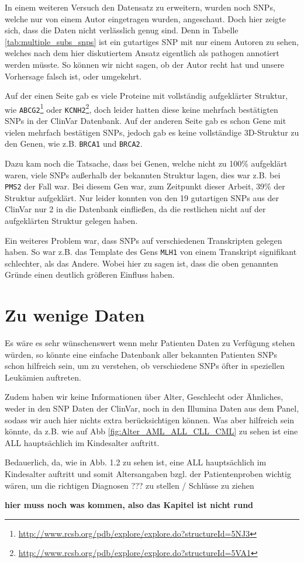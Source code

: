In einem weiteren Versuch den Datensatz zu erweitern, wurden noch \ac{SNP}s, welche nur von einem Autor eingetragen wurden, angeschaut. Doch hier zeigte sich, dass die Daten nicht verlässlich genug sind. Denn in Tabelle \ref{tab:multiple_subs_snps} ist ein gutartiges \ac{SNP} mit nur einem Autoren zu sehen, welches nach dem hier diskutiertem Ansatz eigentlich als pathogen annotiert werden müsste. So können wir nicht sagen, ob der Autor recht hat und unsere Vorhersage falsch ist, oder umgekehrt.

Auf der einen Seite gab es viele Proteine mit vollständig aufgeklärter Struktur, wie \texttt{ABCG2}\footnote{\url{http://www.rcsb.org/pdb/explore/explore.do?structureId=5NJ3}} oder \texttt{KCNH2}\footnote{\url{http://www.rcsb.org/pdb/explore/explore.do?structureId=5VA1}}, doch leider hatten diese keine mehrfach bestätigten \ac{SNP}s in der ClinVar Datenbank. 
Auf der anderen Seite gab es schon Gene mit vielen mehrfach bestätigen \ac{SNP}s, jedoch gab es keine vollständige 3D-Struktur zu den Genen, wie z.B. \texttt{BRCA1} und \texttt{BRCA2}.

Dazu kam noch die Tatsache, dass bei Genen, welche nicht zu 100\% aufgeklärt waren, viele \ac{SNP}s außerhalb der bekannten Struktur lagen, dies war z.B. bei \texttt{PMS2} der Fall war. Bei diesem Gen war, zum Zeitpunkt dieser Arbeit, 39\% der Struktur aufgeklärt. Nur leider konnten von den 19 gutartigen \ac{SNP}s aus der ClinVar nur 2 in die Datenbank einfließen, da die restlichen nicht auf der aufgeklärten Struktur gelegen haben.

Ein weiteres Problem war, dass \ac{SNP}s auf verschiedenen Transkripten gelegen haben. So war z.B. das Template des Gens \texttt{MLH1} von einem Transkript signifikant schlechter, als das Andere. Wobei hier zu sagen ist, dass die oben genannten Gründe einen deutlich größeren Einfluss haben.



\section{Zu wenige Daten}

Es wäre es sehr wünschenswert wenn mehr Patienten Daten zu Verfügung stehen würden, so könnte eine einfache Datenbank aller bekannten Patienten \ac{SNP}s schon hilfreich sein, um zu verstehen, ob verschiedene \ac{SNP}s öfter in speziellen Leukämien auftreten.

Zudem haben wir keine Informationen über Alter, Geschlecht oder Ähnliches, weder in den SNP Daten der ClinVar, noch in den Illumina Daten aus dem Panel, sodass wir auch hier nichts extra berücksichtigen können. Was aber hilfreich sein könnte, da z.B. wie auf \ac{Abb} \ref{fig:Alter_AML_ALL_CLL_CML} zu sehen ist eine \ac{ALL} hauptsächlich im Kindesalter auftritt.

Bedauerlich, da, wie in Abb. 1.2 zu sehen ist, eine ALL hauptsächlich im Kindesalter auftritt und somit Altersangaben bzgl. der Patientenproben wichtig wären, um die richtigen Diagnosen ??? zu stellen / Schlüsse zu ziehen 

\textbf{hier muss noch was kommen, also das Kapitel ist nicht rund}

